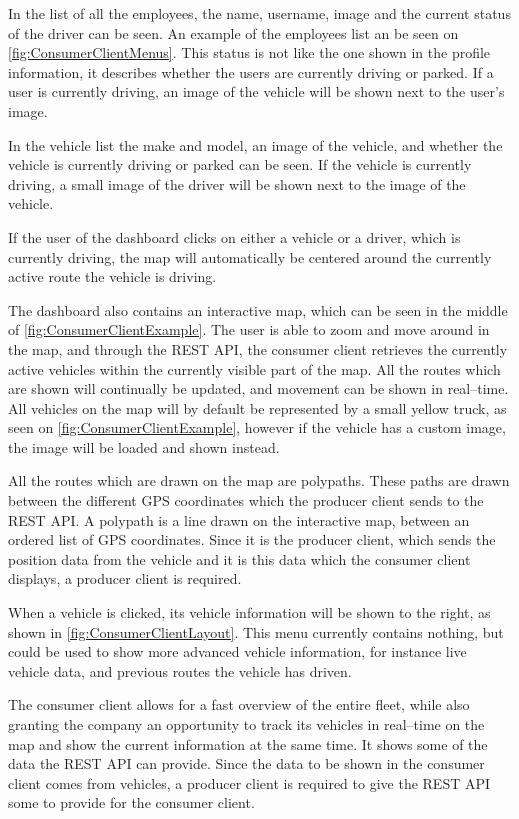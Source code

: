 In the list of all the employees, the name, username, image and the current status of the driver can be seen.
An example of the employees list an be seen on \cref{fig:ConsumerClientMenus}.
This status is not like the one shown in the profile information, it describes whether the users are currently driving or parked.
If a user is currently driving, an image of the vehicle will be shown next to the user's image.

In the vehicle list the make and model, an image of the vehicle, and whether the vehicle is currently driving or parked can be seen.
If the vehicle is currently driving, a small image of the driver will be shown next to the image of the vehicle.

If the user of the dashboard clicks on either a vehicle or a driver, which is currently driving, the map will automatically be centered around the currently active route the vehicle is driving.

\bigskip
The dashboard also contains an interactive map, which can be seen in the middle of \cref{fig:ConsumerClientExample}.
The user is able to zoom and move around in the map, and through the REST API, the consumer client retrieves the currently active vehicles within the currently visible part of the map.
All the routes which are shown will continually be updated, and movement can be shown in real--time.
All vehicles on the map will by default be represented by a small yellow truck, as seen on \cref{fig:ConsumerClientExample}, however if the vehicle has a custom image, the image will be loaded and shown instead.

All the routes which are drawn on the map are polypaths.
These paths are drawn between the different GPS coordinates which the producer client sends to the REST API.
A polypath is a line drawn on the interactive map, between an ordered list of GPS coordinates.
Since it is the producer client, which sends the position data from the vehicle and it is this data which the consumer client displays,
a producer client is required.

When a vehicle is clicked, its vehicle information will be shown to the right, as shown in \cref{fig:ConsumerClientLayout}.
This menu currently contains nothing, but could be used to show more advanced vehicle information, for instance live vehicle data, and previous routes the vehicle has driven.

\bigskip
The consumer client allows for a fast overview of the entire fleet, while also granting the company an opportunity to track its vehicles in real--time on the map and show the current information at the same time.
It shows some of the data the REST API can provide.
Since the data to be shown in the consumer client comes from vehicles, a producer client is required to give the REST API some to provide for the consumer client.

